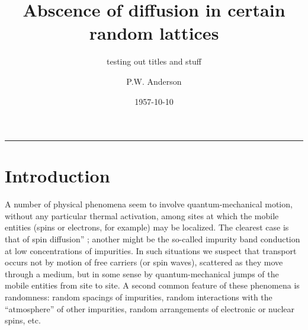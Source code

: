 \documentclass[%
	english,%
	 a4paper,%
	titlepage,%
	fleqn]{article}
\title{Abscence of diffusion in certain random lattices}
\subtitle{testing out titles and stuff}
\author{P.W. Anderson}
\date{1957-10-10}
\def\localDir{/home/pines/.pandoc/quetzalcoatl}
\def\packageDir{\localDir/packages}
\renewcommand\abstractname{\sffamily Abstract}
\begin{document}






% 



 

{
\hypersetup{linkcolor=black}
\setcounter{tocdepth}{3}
\tableofcontents
}

\noindent\rule{\linewidth}{0.05em}

\newpage









\section{Introduction}\label{introduction}

A number of physical phenomena seem to involve quantum-mechanical
motion, without any particular thermal activation, among sites at which
the mobile entities (spins or electrons, for example) may be localized.
The clearest case is that of spin diffusion''
\cite{bloembergen1949,portis1956}; another might be the so-called
impurity band conduction at low concentrations of impurities. In such
situations we suspect that transport occurs not by motion of free
carriers (or spin waves), scattered as they move through a medium, but
in some sense by quantum-mechanical jumps of the mobile entities from
site to site. A second common feature of these phenomena is randomness:
random spacings of impurities, random interactions with the
``atmosphere'' of other impurities, random arrangements of electronic or
nuclear spins, etc.
\end{document}
